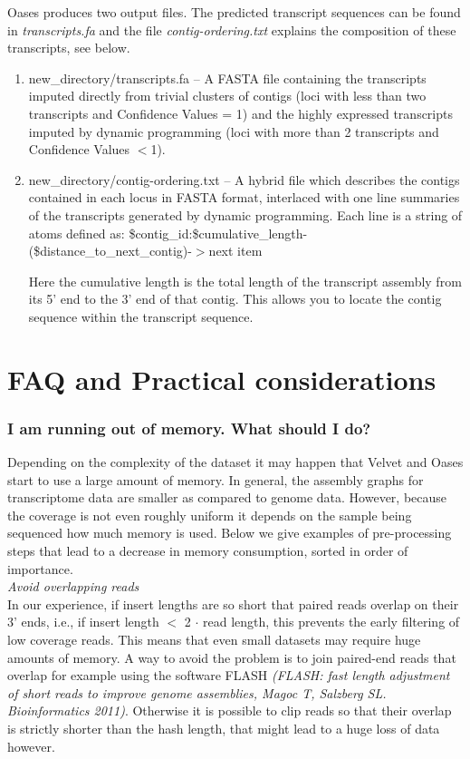 \documentclass[12pt]{article}
\begin{document}
Oases produces two output files. The predicted transcript sequences can be found in \emph{transcripts.fa} and the file \emph{contig-ordering.txt} explains the composition of these transcripts, see below.
\begin{enumerate}
\item new\_directory/transcripts.fa --
	A FASTA file containing the transcripts imputed directly from trivial
	clusters of contigs (loci with less than two transcripts and Confidence Values = 1)
	and the highly expressed transcripts imputed by dynamic
	programming (loci with more than 2 transcripts and Confidence Values $<$1).
   
\item 
new\_directory/contig-ordering.txt --
	A hybrid file which describes the contigs contained in each locus in FASTA
	format, interlaced with one line summaries of the transcripts generated by 
	dynamic programming. Each line is a string of atoms defined as:
	\$contig\_id:\$cumulative\_length-(\$distance\_to\_next\_contig)-$>$next item

	Here the cumulative length is the total length of the transcript assembly from
	its 5' end to the 3' end of that contig. This allows you to locate the contig
	sequence within the transcript sequence.
	
\end{enumerate}	
\section{FAQ and Practical considerations}

\subsubsection*{I am running out of memory. What should I do?}
Depending on the complexity of the dataset it may happen that Velvet and Oases start to use a large amount of memory. In general, the assembly graphs for transcriptome data are smaller as compared to genome data. However, because the coverage is not even roughly uniform it depends on the sample being sequenced how much memory is used. Below we give examples of pre-processing steps that lead to a decrease in memory consumption, sorted in order of importance. \\

\emph{Avoid overlapping reads} \\

In our experience, if insert lengths are so short that paired reads overlap on their 3' ends, i.e., if insert length $<$ 2 $\cdot$ read length, this prevents the early filtering of low coverage reads. This means that even small datasets may require huge amounts of memory. A way to avoid the problem is to join paired-end reads that overlap for example using the software FLASH \emph{(FLASH: fast length adjustment of short reads to improve genome assemblies, Magoc T, Salzberg SL. Bioinformatics 2011)}. Otherwise it is possible to clip reads so that their overlap is strictly shorter than the hash length, that might lead to a huge loss of data however. \\
\end{document}
